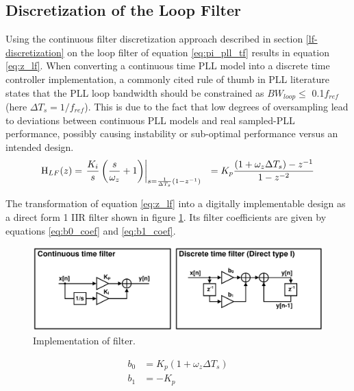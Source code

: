 	\subsection{Discretization of the Loop Filter}\label{disc_lf_comp_pi}
		Using the continuous filter discretization approach described in section \ref{lf-discretization} on the loop filter of equation \ref{eq:pi_pll_tf} results in equation \ref{eq:z_lf}. When converting a continuous time PLL model into a discrete time controller implementation, a commonly cited rule of thumb in PLL literature states that the PLL loop bandwidth should be constrained as $BW_{loop} \leq$  0.1$f_{ref}$ \cite{gardner_1980} (here $\Delta T_s = 1/f_{ref}$). This is due to the fact that low degrees of oversampling lead to deviations between continuous PLL models and real sampled-PLL performance, possibly causing instability or sub-optimal performance versus an intended design.
		\begin{align}
			\textnormal{H}_{LF}(z) & = \left.\frac{K_i}{s}\left(\frac{s}{\omega_z} + 1\right)\right\vert_{s=\frac{1}{\Delta T_s}(1-z^{-1})}
			&= K_p\frac{(1+\omega_z\Delta T_s)-z^{-1}}{1- z^{-2}}\label{eq:z_lf}
		\end{align}

		The transformation of equation \ref{eq:z_lf} into a digitally implementable design as a direct form 1 IIR filter shown in figure \ref{fig:filt_imple}. Its filter coefficients are given by equations \ref{eq:b0_coef} and \ref{eq:b1_coef}.
		\begin{figure}[htb!]
			\center\includegraphics[width=1\textwidth, angle=0]{./figs/design/filter_arch_pi}
			\caption{Implementation of filter.}
			\label{fig:filt_imple}
		\end{figure}

		\begin{align}
			b_0 &= K_p (1+\omega_z\Delta T_s) \label{eq:b0_coef}\\
			 b_1 &= -K_p \label{eq:b1_coef}
		\end{align}


